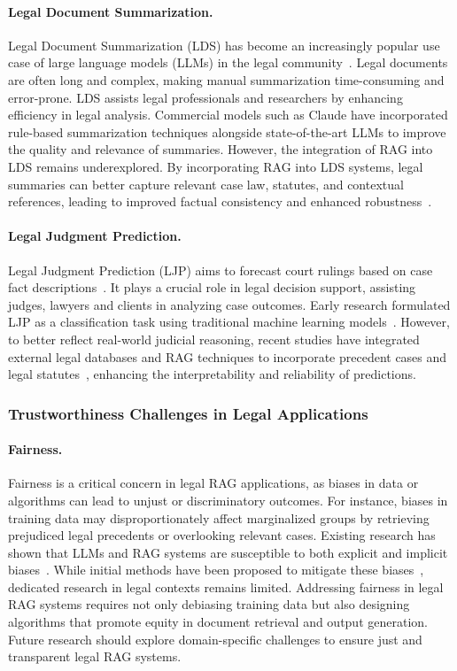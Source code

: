 \paragraph{Legal Document Summarization.}
Legal Document Summarization (LDS) has become an increasingly popular use case of large language models (LLMs) in the legal community~\cite{Anthropic_Legal_Summarization, chen2024survey}. Legal documents are often long and complex, making manual summarization time-consuming and error-prone. LDS assists legal professionals and researchers by enhancing efficiency in legal analysis. Commercial models such as Claude have incorporated rule-based summarization techniques alongside state-of-the-art LLMs to improve the quality and relevance of summaries. However, the integration of RAG into LDS remains underexplored. By incorporating RAG into LDS systems, legal summaries can better capture relevant case law, statutes, and contextual references, leading to improved factual consistency and enhanced robustness~\cite{liu2024robustretrievalbasedsummarization}. 

\paragraph{Legal Judgment Prediction.}
Legal Judgment Prediction (LJP) aims to forecast court rulings based on case fact descriptions~\cite{chen2024survey}. It plays a crucial role in legal decision support, assisting judges, lawyers and clients in analyzing case outcomes. Early research formulated LJP as a classification task using traditional machine learning models~\cite{cui2022surveylegaljudgmentprediction}. However, to better reflect real-world judicial reasoning, recent studies have integrated external legal databases and RAG techniques to incorporate precedent cases and legal statutes~\cite{wu-etal-2023-precedent}, enhancing the interpretability and reliability of predictions. 

\subsubsection{Trustworthiness Challenges in Legal Applications}
\paragraph{Fairness.}
Fairness is a critical concern in legal RAG applications, as biases in data or algorithms can lead to unjust or discriminatory outcomes. For instance, biases in training data may disproportionately affect marginalized groups by retrieving prejudiced legal precedents or overlooking relevant cases. Existing research has shown that LLMs and RAG systems are susceptible to both explicit and implicit biases~\cite{shrestha2024fairrag, wan2023genderbiases}. While initial methods have been proposed to mitigate these biases~\cite{10.1162/coli_a_00524}, dedicated research in legal contexts remains limited. Addressing fairness in legal RAG systems requires not only debiasing training data but also designing algorithms that promote equity in document retrieval and output generation. Future research should explore domain-specific challenges to ensure just and transparent legal RAG systems.

